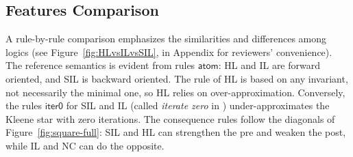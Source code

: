 \subsection{Features Comparison}

A rule-by-rule comparison emphasizes the similarities and differences among logics (see Figure~\ref{fig:HLvsILvsSIL}, in Appendix for reviewers' convenience).
The reference semantics is evident from rules $\mathsf{atom}$: HL and IL are forward oriented, and SIL is backward oriented.
The rule  of HL is based on any invariant, not necessarily the minimal one, so HL relies on over-approximation.
Conversely, the rules $\mathsf{iter0}$ for SIL and IL (called \emph{iterate zero} in \cite{DBLP:journals/pacmpl/OHearn20}) under-approximates the Kleene star with zero iterations.
The consequence rules follow the diagonals of Figure~\ref{fig:square-full}: SIL and HL can strengthen the pre and weaken the post, while IL and NC can do the opposite.


